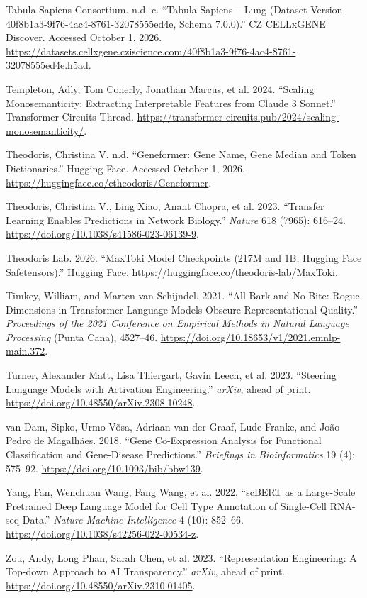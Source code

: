\documentclass[
  11pt,
]{article}
\newlength{\cslhangindent}
\newenvironment{CSLReferences}[2] %
 {\begin{list}{}{%
  \setlength{\itemindent}{0pt}
  \setlength{\leftmargin}{0pt}
  \setlength{\parsep}{0pt}
  \ifodd #1
   \setlength{\leftmargin}{\cslhangindent}
   \setlength{\itemindent}{-1\cslhangindent}
  \fi
  \setlength{\itemsep}{#2\baselineskip}}}
 {\end{list}}
\begin{document}
\begin{CSLReferences}{1}{1}
Tabula Sapiens Consortium. n.d.-c. {``Tabula {Sapiens} -- Lung (Dataset
Version 40f8b1a3-9f76-4ac4-8761-32078555ed4e, Schema 7.0.0).''} CZ
CELLxGENE Discover. Accessed October 1, 2026.
\url{https://datasets.cellxgene.cziscience.com/40f8b1a3-9f76-4ac4-8761-32078555ed4e.h5ad}.

{Templeton, Adly, Tom Conerly, Jonathan Marcus, et al.} 2024. {``Scaling
Monosemanticity: Extracting Interpretable Features from {Claude} 3
{Sonnet}.''} Transformer Circuits Thread.
\url{https://transformer-circuits.pub/2024/scaling-monosemanticity/}.

Theodoris, Christina V. n.d. {``Geneformer: Gene Name, Gene Median and
Token Dictionaries.''} Hugging Face. Accessed October 1, 2026.
\url{https://huggingface.co/ctheodoris/Geneformer}.

Theodoris, Christina V., Ling Xiao, Anant Chopra, et al. 2023.
{``Transfer Learning Enables Predictions in Network Biology.''}
\emph{Nature} 618 (7965): 616--24.
\url{https://doi.org/10.1038/s41586-023-06139-9}.

Theodoris Lab. 2026. {``{MaxToki} Model Checkpoints (217M and 1B,
{Hugging Face} Safetensors).''} Hugging Face.
\url{https://huggingface.co/theodoris-lab/MaxToki}.

{Timkey, William, and Marten van Schijndel}. 2021. {``All Bark and No
Bite: Rogue Dimensions in Transformer Language Models Obscure
Representational Quality.''} \emph{{Proceedings of the 2021 Conference
on Empirical Methods in Natural Language Processing}} (Punta Cana),
4527--46. \url{https://doi.org/10.18653/v1/2021.emnlp-main.372}.

Turner, Alexander Matt, Lisa Thiergart, Gavin Leech, et al. 2023.
{``Steering Language Models with Activation Engineering.''}
\emph{arXiv}, ahead of print.
\url{https://doi.org/10.48550/arXiv.2308.10248}.

{van Dam, Sipko, Urmo Võsa, Adriaan van der Graaf, Lude Franke, and João
Pedro de Magalhães}. 2018. {``Gene Co-Expression Analysis for Functional
Classification and Gene-Disease Predictions.''} \emph{Briefings in
Bioinformatics} 19 (4): 575--92.
\url{https://doi.org/10.1093/bib/bbw139}.

Yang, Fan, Wenchuan Wang, Fang Wang, et al. 2022. {``{scBERT} as a
Large-Scale Pretrained Deep Language Model for Cell Type Annotation of
Single-Cell {RNA-seq} Data.''} \emph{Nature Machine Intelligence} 4
(10): 852--66. \url{https://doi.org/10.1038/s42256-022-00534-z}.

{Zou, Andy, Long Phan, Sarah Chen, et al.} 2023. {``Representation
Engineering: A Top-down Approach to {AI} Transparency.''} \emph{arXiv},
ahead of print. \url{https://doi.org/10.48550/arXiv.2310.01405}.

\end{CSLReferences}
\end{document}
